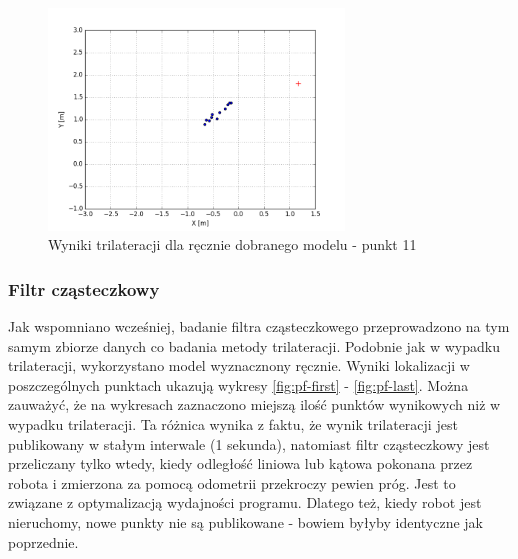 \begin{figure}[H]
\centering
\includegraphics[width=0.7\textwidth]{img/trilat-map3-11.png}
\caption{Wyniki trilateracji dla ręcznie dobranego modelu - punkt 11}
\label{fig:trilat-last}
\end{figure}


\subsubsection{Filtr cząsteczkowy}
Jak wspomniano wcześniej, badanie filtra cząsteczkowego przeprowadzono na tym samym zbiorze danych co badania metody trilateracji. Podobnie jak w wypadku trilateracji, wykorzystano model wyznacznony ręcznie. Wyniki lokalizacji w poszczególnych punktach ukazują wykresy \ref{fig:pf-first} - \ref{fig:pf-last}. Można zauważyć, że na wykresach zaznaczono miejszą ilość punktów wynikowych niż w wypadku trilateracji. Ta różnica wynika z faktu, że wynik trilateracji jest publikowany w stałym interwale (1 sekunda), natomiast filtr cząsteczkowy jest przeliczany tylko wtedy, kiedy odległość liniowa lub kątowa pokonana przez robota i zmierzona za pomocą odometrii przekroczy pewien próg. Jest to związane z optymalizacją wydajności programu. Dlatego też, kiedy robot jest nieruchomy, nowe punkty nie są publikowane - bowiem byłyby identyczne jak poprzednie.


